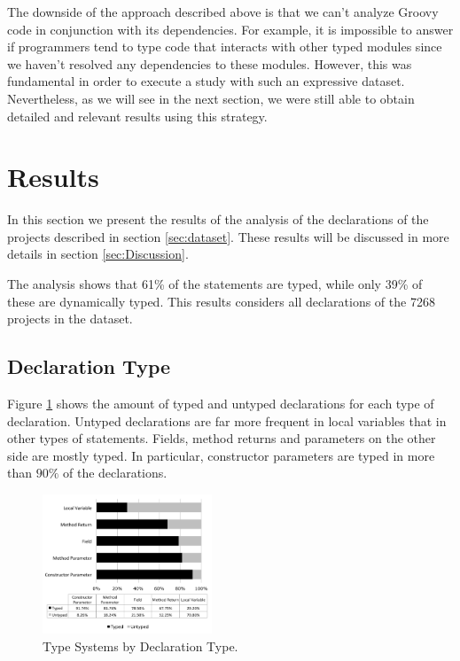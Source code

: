 \documentclass[preprint]{sigplanconf}
\begin{document}
The downside of the approach described above is that we can't analyze Groovy code in conjunction with its dependencies. 
For example, it is impossible to answer if programmers tend to type code that interacts with other typed modules since we haven't resolved any dependencies to these modules.
However, this was fundamental in order to execute a study with such an expressive dataset.
Nevertheless, as we will see in the next section, we were still able to obtain detailed and relevant results using this strategy.











%
%
\section{Results\label{sec:results}}

In this section we present the results of the analysis of the declarations of the projects described in section \ref{sec:dataset}. 
These results will be discussed in more details in section \ref{sec:Discussion}.

The analysis shows that 61\% of the statements are typed, while only 39\% of these are dynamically typed. This results considers all declarations of the 7268 projects in the dataset.

\subsection{Declaration Type\label{sub:declaration-type-results}}
Figure \ref{fig:tipo_declaracao} shows the amount of typed and untyped declarations for each type of declaration. 
Untyped declarations are far more frequent in local variables that in other types of statements.
Fields, method returns and parameters on the other side are mostly typed. In particular, constructor parameters are typed in more than $90\%$ of the declarations.

\begin{figure}[ht]
\centering 
\includegraphics[width=0.45\textwidth]{images/type} 
\caption{Type Systems by Declaration Type.}
\label{fig:tipo_declaracao} 
\end{figure}
\end{document}
